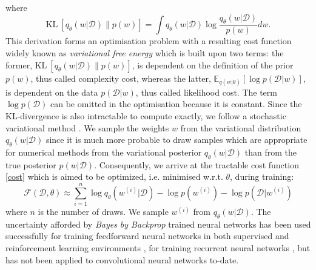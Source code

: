 where
\begin{equation}
    \text{KL} \ [q_{\theta}(w|\mathcal{D})\|p(w)]= \int q_{\theta}(w|\mathcal{D})\log\frac{q_{\theta}(w|\mathcal{D})}{p(w)}dw .
\end{equation}
This derivation forms an optimisation problem with a resulting cost function widely known as \textit{variational free energy} \cite{neal1998view,yedidia2005constructing,friston2007variational} which is built upon two terms: the former, $\text{KL} \ [q_{\theta}(w|\mathcal{D})\|p(w)]$, is dependent on the definition of the prior $p(w)$, thus called complexity cost, whereas the latter, $\mathbb{E}_{q(w|\theta)}[\log p(\mathcal{D}|w)]$, is dependent on the data $p(\mathcal{D}|w)$, thus called likelihood cost. 
The term $\log p(\mathcal{D})$ can be omitted in the optimisation because it is constant.
\newline Since the KL-divergence is also intractable to compute exactly, we follow a stochastic variational method \cite{graves2011practical,blundell2015weight}.
We sample the weights $w$ from the variational distribution $q_{\theta}(w|\mathcal{D})$ since it is much more probable to draw samples which are appropriate for numerical methods from the variational posterior $q_{\theta}(w|\mathcal{D})$ than from the true posterior $p(w|\mathcal{D})$. Consequently, we arrive at the tractable cost function \eqref{cost} which is aimed to be optimized, i.e. minimised w.r.t. $\theta$, during training:
\begin{equation} \label{cost}
    \mathcal{F}(\mathcal{D}, \theta)\approx \sum_{i=1}^n \log q_{\theta}(w^{(i)}|\mathcal{D})-\log p(w^{(i)})-\log p(\mathcal{D}|w^{(i)})
\end{equation}
%
where $n$ is the number of draws.
\newline We sample $w^{(i)}$ from $q_{\theta}(w|\mathcal{D})$. The uncertainty afforded by \textit{Bayes by Backprop} trained neural networks has been used successfully for training feedforward neural networks in both supervised and reinforcement learning environments \cite{blundell2015weight,lipton2016efficient,houthooft2016curiosity}, for training recurrent neural networks \cite{fortunato2017bayesian}, but has not been applied to convolutional neural networks to-date.


